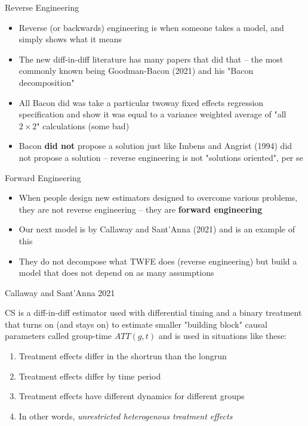 \documentclass{beamer}
\begin{document}
\begin{frame}{Reverse Engineering}

\begin{itemize}
\item Reverse (or backwards) engineering is when someone takes a model, and simply shows what it means
\item The new diff-in-diff literature has many papers that did that -- the most commonly known being Goodman-Bacon (2021) and his "Bacon decomposition"
\item All Bacon did was take a particular twoway fixed effects regression specification and show it was equal to a variance weighted average of "all $2 \times 2$" calculations (some bad)
\item Bacon \textbf{did not} propose a solution just like Imbens and Angrist (1994) did not propose a solution -- reverse engineering is not "solutions oriented", per se

\end{itemize}

\end{frame}

\begin{frame}{Forward Engineering}

\begin{itemize}
\item When people design new estimators designed to overcome various problems, they are not reverse engineering -- they are \textbf{forward engineering}
\item Our next model is by Callaway and Sant'Anna (2021) and is an example of this 
\item They do not decompose what TWFE does (reverse engineering) but build a model that does not depend on as many assumptions
\end{itemize}

\end{frame}





\begin{frame}{Callaway and Sant'Anna 2021}

CS is a diff-in-diff estimator used with differential timing and a binary treatment that turns on (and stays on) to estimate smaller "building block" causal parameters called group-time $ATT(g,t)$ and is used in situations like these:

\begin{enumerate}
\item Treatment effects differ in the shortrun than the longrun
\item Treatment effects differ by time period
\item Treatment effects have different dynamics for different groups
\item In other words, \emph{unrestricted heterogenous treatment effects}
\end{enumerate}


\end{frame}
\end{document}
